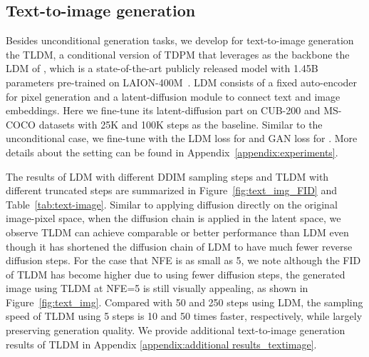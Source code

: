 \documentclass{article} \usepackage{iclr2023_conference,times}
\def\Figref#1{Figure~\ref{#1}}
\theoremstyle{plain}
\theoremstyle{definition}
\theoremstyle{remark}
\begin{document}
{\vspace{-2mm}\subsection{Text-to-image generation}
Besides unconditional generation tasks,  we develop for text-to-image generation the TLDM, a conditional version of TDPM that leverages  as the backbone the LDM of \citet{rombach2022high}, which is a state-of-the-art publicly released model with 1.45B parameters pre-trained on LAION-400M~\citep{laion}. LDM consists of a fixed auto-encoder for pixel generation and a latent-diffusion module to connect text and image embeddings. Here we fine-tune its latent-diffusion part on CUB-200 and MS-COCO datasets with 25K and 100K steps as the baseline. Similar to the unconditional case, we fine-tune with the LDM loss for  and GAN loss for . More details about the setting can be found in Appendix~\ref{appendix:experiments}. 

The results of LDM with different DDIM sampling steps and TLDM with different truncated steps are summarized in \Figref{fig:text_img_FID} and Table~\ref{tab:text-image}. Similar to applying diffusion directly on the original image-pixel space, when the diffusion chain is applied in the latent space, we observe 
TLDM can achieve comparable or better performance than LDM even though it has shortened the diffusion chain of LDM to have much fewer reverse diffusion steps.
For the case that NFE is as small as 5, we note although the FID of TLDM has become higher due to using fewer diffusion steps, the generated image using TLDM at NFE=5 is still visually appealing, as shown in \Figref{fig:text_img}. Compared with 50 and 250 steps using LDM,
the sampling speed of TLDM using 5 steps is 10 and 50 times faster, respectively, while largely preserving generation quality.
We provide additional text-to-image generation results of TLDM in Appendix \ref{appendix:additional results_textimage}.



}
\end{document}
